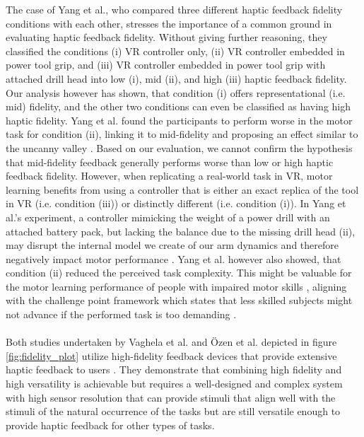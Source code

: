 The case of Yang et al., who compared three different haptic feedback fidelity conditions with each other, stresses the importance of a common ground in evaluating haptic feedback fidelity. Without giving further reasoning, they classified the conditions (i) VR controller only, (ii) VR controller embedded in power tool grip, and (iii) VR controller embedded in power tool grip with attached drill head into low (i), mid (ii), and high (iii) haptic feedback fidelity. Our analysis however has shown, that condition (i) offers representational (i.e. mid) fidelity, and the other two conditions can even be classified as having high haptic fidelity. Yang et al. found the participants to perform worse in the motor task for condition (ii), linking it to mid-fidelity and proposing an effect similar to the uncanny valley \cite{Mori2012TheValley, Yang2023}. Based on our evaluation, we cannot confirm the hypothesis that mid-fidelity feedback generally performs worse than low or high haptic feedback fidelity. 
However, when replicating a real-world task in VR, motor learning benefits from using a controller that is either an exact replica of the tool in VR (i.e. condition (iii)) or distinctly different (i.e. condition (i)). In Yang et al.'s experiment, a controller mimicking the weight of a power drill with an attached battery pack, but lacking the balance due to the missing drill head (ii), may disrupt the internal model we create of our arm dynamics and therefore negatively impact motor performance \cite{Yang2023}. 
Yang et al. however also showed, that condition (ii) reduced the perceived task complexity. This might be valuable for the motor learning performance of people with impaired motor skills \cite{Sigrist2013AugmentedReview}, aligning with the challenge point framework which states that less skilled subjects might not advance if the performed task is too demanding \cite{Guadagnoll2004ChallengeLearning}. 


\paragraph{}
Both studies undertaken by Vaghela et al. and Özen et al. depicted in figure \ref{fig:fidelity_plot} utilize high-fidelity feedback devices that provide extensive haptic feedback to users \cite{Vaghela2021, Oezen2022}. They demonstrate that combining high fidelity and high versatility is achievable but requires a well-designed and complex system with high sensor resolution that can provide stimuli that align well with the stimuli of the natural occurrence of the tasks but are still versatile enough to provide haptic feedback for other types of tasks.

